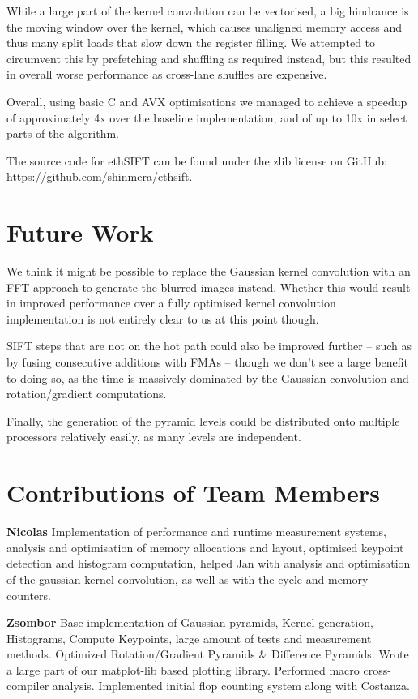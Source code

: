 \documentclass[letterpaper]{article}
\begin{document}
While a large part of the kernel convolution can be vectorised, a big hindrance is the moving window over the kernel, which causes unaligned memory access and thus many split loads that slow down the register filling. We attempted to circumvent this by prefetching and shuffling as required instead, but this resulted in overall worse performance as cross-lane shuffles are expensive.

Overall, using basic C and AVX optimisations we managed to achieve a speedup of approximately 4x over the baseline implementation, and of up to 10x in select parts of the algorithm.

The source code for ethSIFT can be found under the zlib license on GitHub: \\\url{https://github.com/shinmera/ethsift}.

\section{Future Work}
We think it might be possible to replace the Gaussian kernel convolution with an FFT approach to generate the blurred images instead. Whether this would result in improved performance over a fully optimised kernel convolution implementation is not entirely clear to us at this point though.

SIFT steps that are not on the hot path could also be improved further -- such as by fusing consecutive additions with FMAs -- though we don't see a large benefit to doing so, as the time is massively dominated by the Gaussian convolution and rotation/gradient computations.

Finally, the generation of the pyramid levels could be distributed onto multiple processors relatively easily, as many levels are independent.

\section{Contributions of Team Members}
\textbf{Nicolas} Implementation of performance and runtime measurement systems, analysis and optimisation of memory allocations and layout, optimised keypoint detection and histogram computation, helped Jan with analysis and optimisation of the gaussian kernel convolution, as well as with the cycle and memory counters.

\textbf{Zsombor} Base implementation of Gaussian pyramids, Kernel generation, Histograms, Compute Keypoints, large amount of tests and measurement methods. Optimized Rotation/Gradient Pyramids \& Difference Pyramids. Wrote a large part of our matplot-lib based plotting library. Performed macro cross-compiler analysis. Implemented initial flop counting system along with Costanza.
\end{document}
